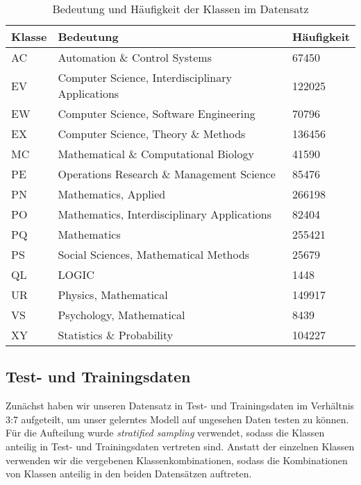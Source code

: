 \begin{table}[h]
    \centering
    \begin{tabular}{l|l|l}
        \textbf{Klasse} & \textbf{Bedeutung} & \textbf{Häufigkeit}\\
        \hline
        AC & Automation \& Control Systems & 67450\\
        EV & Computer Science, Interdisciplinary Applications & 122025\\
        EW & Computer Science, Software Engineering & 70796\\
        EX & Computer Science, Theory \& Methods & 136456\\
        MC & Mathematical \& Computational Biology & 41590\\
        PE & Operations Research \& Management Science & 85476\\
        PN & Mathematics, Applied & 266198\\
        PO & Mathematics, Interdisciplinary Applications & 82404\\
        PQ & Mathematics & 255421\\
        PS & Social Sciences, Mathematical Methods & 25679\\
        QL & LOGIC & 1448\\
        UR & Physics, Mathematical & 149917\\
        VS & Psychology, Mathematical & 8439\\
        XY & Statistics \& Probability & 104227\\
    \end{tabular}
    \caption{Bedeutung und Häufigkeit der Klassen im Datensatz}
    \label{tab:class_meaning}
\end{table}



\subsection{Test- und Trainingsdaten}
\label{sub:test_und_trainingsdaten}
Zunächst haben wir unseren Datensatz in Test- und Trainingsdaten im Verhältnis 3:7 aufgeteilt, um unser gelerntes Modell auf ungesehen Daten testen zu können.
Für die Aufteilung wurde \emph{stratified sampling} verwendet, sodass die Klassen anteilig in Test- und Trainingsdaten vertreten sind.
Anstatt der einzelnen Klassen verwenden wir die vergebenen Klassenkombinationen, sodass die Kombinationen von Klassen anteilig in den beiden Datensätzen auftreten.


